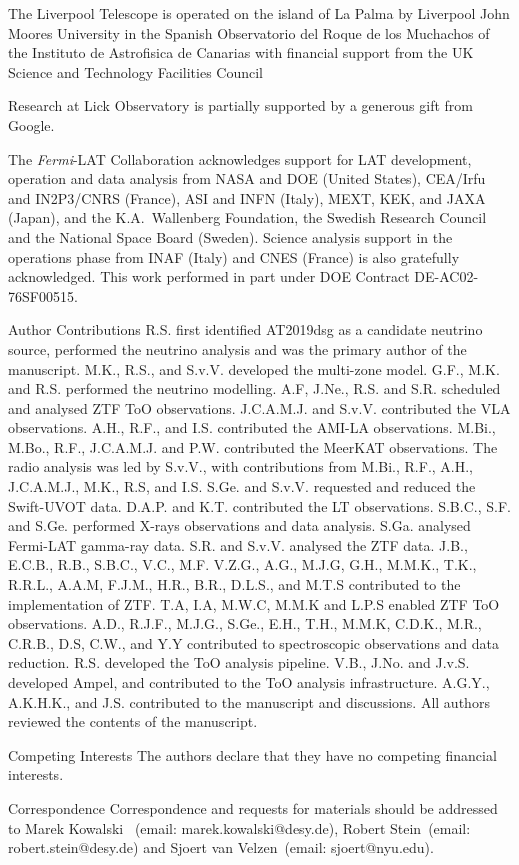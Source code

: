 \documentclass{nature_plusfigure}
\begin{document}
\begin{addendum}
The Liverpool Telescope is operated on the island of La Palma by Liverpool John Moores University in the Spanish Observatorio del Roque de los Muchachos of the Instituto de Astrofisica de Canarias with financial support from the UK Science and Technology Facilities Council

Research at Lick Observatory is partially supported by a generous gift from Google.

The \textit{Fermi}-LAT Collaboration acknowledges support for LAT development, operation and data analysis from NASA and DOE (United States), CEA/Irfu and IN2P3/CNRS (France), ASI and INFN (Italy), MEXT, KEK, and JAXA (Japan), and the K.A.~Wallenberg Foundation, the Swedish Research Council and the National Space Board (Sweden). Science analysis support in the operations phase from INAF (Italy) and CNES (France) is also gratefully acknowledged. This work performed in part under DOE Contract DE-AC02-76SF00515. 
\item[Author Contributions] R.S. first identified AT2019dsg as a candidate neutrino source, performed the neutrino analysis and was the primary author of the manuscript. M.K., R.S., and S.v.V. developed the multi-zone model. G.F., M.K. and R.S. performed the neutrino modelling. A.F, J.Ne., R.S. and S.R. scheduled and analysed ZTF ToO observations. J.C.A.M.J. and S.v.V. contributed the VLA observations. A.H., R.F., and I.S. contributed the AMI-LA observations. M.Bi., M.Bo., R.F., J.C.A.M.J. and P.W. contributed the MeerKAT observations. The radio analysis was led by S.v.V., with contributions from M.Bi., R.F., A.H., J.C.A.M.J., M.K., R.S, and I.S. S.Ge. and S.v.V. requested and reduced the Swift-UVOT data. D.A.P. and K.T. contributed the LT observations. S.B.C., S.F. and S.Ge. performed X-rays observations and data analysis. S.Ga. analysed Fermi-LAT gamma-ray data. S.R. and S.v.V. analysed the ZTF data. J.B., E.C.B., R.B., S.B.C., V.C., M.F. V.Z.G., A.G., M.J.G, G.H., M.M.K., T.K., R.R.L., A.A.M, F.J.M., H.R., B.R., D.L.S., and M.T.S contributed to the implementation of ZTF. T.A, I.A, M.W.C, M.M.K and L.P.S enabled ZTF ToO observations. A.D., R.J.F., M.J.G., S.Ge., E.H., T.H., M.M.K, C.D.K., M.R., C.R.B., D.S, C.W., and Y.Y contributed to spectroscopic observations and data reduction. R.S. developed the ToO analysis pipeline. V.B., J.No. and J.v.S. developed Ampel, and contributed to the ToO analysis infrastructure. A.G.Y., A.K.H.K., and J.S. contributed to the manuscript and discussions. All authors reviewed the contents of the manuscript.

 \item[Competing Interests] The authors declare that they have no
competing financial interests.
 \item[Correspondence] Correspondence and requests for materials
should be addressed to Marek Kowalski ~(email: marek.kowalski@desy.de), Robert Stein~(email: robert.stein@desy.de) and Sjoert van Velzen~(email: sjoert@nyu.edu).
\end{addendum}
\end{document}
